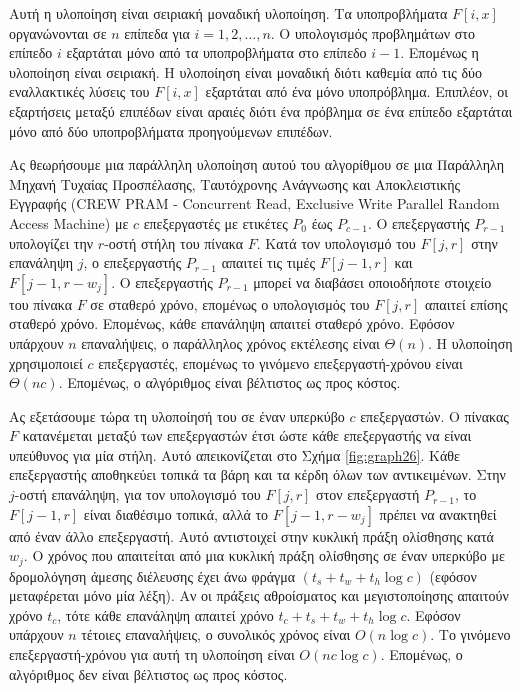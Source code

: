 \documentclass[12pt,a4paper]{article}
\begin{document}
Αυτή η υλοποίηση είναι σειριακή μοναδική υλοποίηση. Τα υποπροβλήματα
$F[i, x]$ οργανώνονται σε $n$ επίπεδα για $i = 1, 2, \ldots, n$.
Ο υπολογισμός προβλημάτων στο επίπεδο $i$ εξαρτάται μόνο από τα
υποπροβλήματα στο επίπεδο $i - 1$. Επομένως η υλοποίηση είναι
σειριακή. Η υλοποίηση είναι μοναδική διότι καθεμία από τις δύο
εναλλακτικές λύσεις του $F[i, x]$ εξαρτάται από ένα μόνο υποπρόβλημα.
Επιπλέον, οι εξαρτήσεις μεταξύ επιπέδων είναι αραιές διότι ένα
πρόβλημα σε ένα επίπεδο εξαρτάται μόνο από δύο υποπροβλήματα
προηγούμενων επιπέδων.

Ας θεωρήσουμε μια παράλληλη υλοποίηση αυτού του αλγορίθμου σε μια 
Παράλληλη Μηχανή Τυχαίας Προσπέλασης, Ταυτόχρονης Ανάγνωσης και 
Αποκλειστικής Εγγραφής (\foreignlanguage{english}{CREW PRAM - 
Concurrent Read, Exclusive Write Parallel Random Access Machine}) 
με $c$ επεξεργαστές με ετικέτες $P_0$ έως $P_{c-1}$.
Ο επεξεργαστής $P_{r-1}$ υπολογίζει την $r$-οστή στήλη του πίνακα
$F$. Κατά τον υπολογισμό του $F[j, r]$ στην επανάληψη $j$, ο
επεξεργαστής $P_{r-1}$ απαιτεί τις τιμές $F[j-1, r]$ και
$F[j-1, r-w_j]$. Ο επεξεργαστής $P_{r-1}$ μπορεί να διαβάσει
οποιοδήποτε στοιχείο του πίνακα $F$ σε σταθερό χρόνο, επομένως ο
υπολογισμός του $F[j, r]$ απαιτεί επίσης σταθερό χρόνο. Επομένως,
κάθε επανάληψη απαιτεί σταθερό χρόνο. Εφόσον υπάρχουν $n$ επαναλήψεις, 
ο παράλληλος χρόνος εκτέλεσης είναι $\Theta(n)$. Η υλοποίηση χρησιμοποιεί 
$c$ επεξεργαστές, επομένως το γινόμενο επεξεργαστή-χρόνου είναι 
$\Theta(nc)$. Επομένως, ο αλγόριθμος είναι βέλτιστος ως προς κόστος.

Ας εξετάσουμε τώρα τη υλοποίησή του σε έναν υπερκύβο $c$
επεξεργαστών. Ο πίνακας $F$ κατανέμεται μεταξύ των επεξεργαστών
έτσι ώστε κάθε επεξεργαστής να είναι υπεύθυνος για μία στήλη. Αυτό
απεικονίζεται στο Σχήμα \ref{fig:graph26}. Κάθε επεξεργαστής αποθηκεύει τοπικά τα
βάρη και τα κέρδη όλων των αντικειμένων. Στην $j$-οστή επανάληψη,
για τον υπολογισμό του $F[j, r]$ στον επεξεργαστή $P_{r-1}$, το
$F[j-1, r]$ είναι διαθέσιμο τοπικά, αλλά το $F[j-1, r-w_j]$ πρέπει
να ανακτηθεί από έναν άλλο επεξεργαστή. Αυτό αντιστοιχεί στην
κυκλική πράξη ολίσθησης κατά $w_j$.
Ο χρόνος που απαιτείται από μια κυκλική πράξη ολίσθησης σε έναν
υπερκύβο με δρομολόγηση άμεσης διέλευσης έχει άνω φράγμα
$(t_s + t_w + t_h \log c)$ (εφόσον μεταφέρεται μόνο μία λέξη). Αν
οι πράξεις αθροίσματος και μεγιστοποίησης απαιτούν χρόνο $t_c$, τότε
κάθε επανάληψη απαιτεί χρόνο $t_c + t_s + t_w + t_h \log c$. Εφόσον
υπάρχουν $n$ τέτοιες επαναλήψεις, ο συνολικός χρόνος είναι
$O(n \log c)$. Το γινόμενο επεξεργαστή-χρόνου για αυτή τη υλοποίηση
είναι $O(nc \log c)$. Επομένως, ο αλγόριθμος δεν είναι βέλτιστος ως
προς κόστος.
\end{document}
